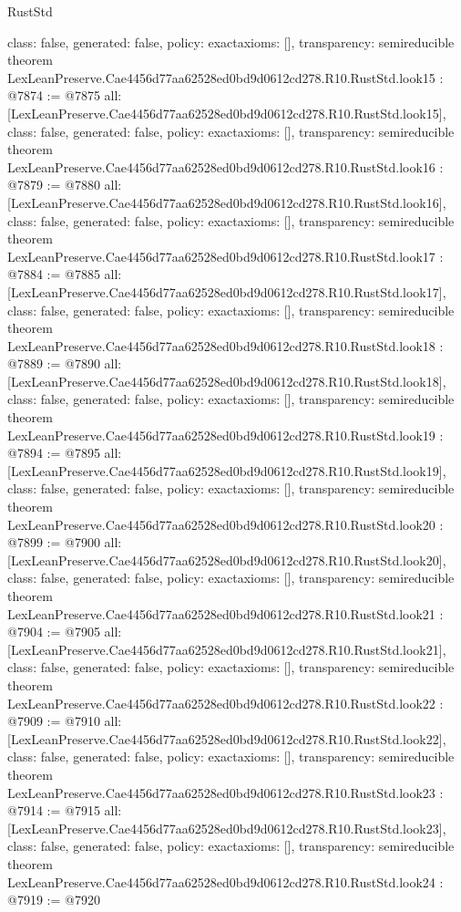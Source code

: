 \begin{lexlean}{RustStd}
\begin{coremodule}
{  class: false,
  generated: false,
  policy: exact{axioms: []},
  transparency: semireducible
}
theorem LexLeanPreserve.Cae4456d77aa62528ed0bd9d0612cd278.R10.RustStd.look15 : @7874 := @7875 {
  all: [LexLeanPreserve.Cae4456d77aa62528ed0bd9d0612cd278.R10.RustStd.look15],
  class: false,
  generated: false,
  policy: exact{axioms: []},
  transparency: semireducible
}
theorem LexLeanPreserve.Cae4456d77aa62528ed0bd9d0612cd278.R10.RustStd.look16 : @7879 := @7880 {
  all: [LexLeanPreserve.Cae4456d77aa62528ed0bd9d0612cd278.R10.RustStd.look16],
  class: false,
  generated: false,
  policy: exact{axioms: []},
  transparency: semireducible
}
theorem LexLeanPreserve.Cae4456d77aa62528ed0bd9d0612cd278.R10.RustStd.look17 : @7884 := @7885 {
  all: [LexLeanPreserve.Cae4456d77aa62528ed0bd9d0612cd278.R10.RustStd.look17],
  class: false,
  generated: false,
  policy: exact{axioms: []},
  transparency: semireducible
}
theorem LexLeanPreserve.Cae4456d77aa62528ed0bd9d0612cd278.R10.RustStd.look18 : @7889 := @7890 {
  all: [LexLeanPreserve.Cae4456d77aa62528ed0bd9d0612cd278.R10.RustStd.look18],
  class: false,
  generated: false,
  policy: exact{axioms: []},
  transparency: semireducible
}
theorem LexLeanPreserve.Cae4456d77aa62528ed0bd9d0612cd278.R10.RustStd.look19 : @7894 := @7895 {
  all: [LexLeanPreserve.Cae4456d77aa62528ed0bd9d0612cd278.R10.RustStd.look19],
  class: false,
  generated: false,
  policy: exact{axioms: []},
  transparency: semireducible
}
theorem LexLeanPreserve.Cae4456d77aa62528ed0bd9d0612cd278.R10.RustStd.look20 : @7899 := @7900 {
  all: [LexLeanPreserve.Cae4456d77aa62528ed0bd9d0612cd278.R10.RustStd.look20],
  class: false,
  generated: false,
  policy: exact{axioms: []},
  transparency: semireducible
}
theorem LexLeanPreserve.Cae4456d77aa62528ed0bd9d0612cd278.R10.RustStd.look21 : @7904 := @7905 {
  all: [LexLeanPreserve.Cae4456d77aa62528ed0bd9d0612cd278.R10.RustStd.look21],
  class: false,
  generated: false,
  policy: exact{axioms: []},
  transparency: semireducible
}
theorem LexLeanPreserve.Cae4456d77aa62528ed0bd9d0612cd278.R10.RustStd.look22 : @7909 := @7910 {
  all: [LexLeanPreserve.Cae4456d77aa62528ed0bd9d0612cd278.R10.RustStd.look22],
  class: false,
  generated: false,
  policy: exact{axioms: []},
  transparency: semireducible
}
theorem LexLeanPreserve.Cae4456d77aa62528ed0bd9d0612cd278.R10.RustStd.look23 : @7914 := @7915 {
  all: [LexLeanPreserve.Cae4456d77aa62528ed0bd9d0612cd278.R10.RustStd.look23],
  class: false,
  generated: false,
  policy: exact{axioms: []},
  transparency: semireducible
}
theorem LexLeanPreserve.Cae4456d77aa62528ed0bd9d0612cd278.R10.RustStd.look24 : @7919 := @7920 {
}
\end{coremodule}
\end{lexlean}
